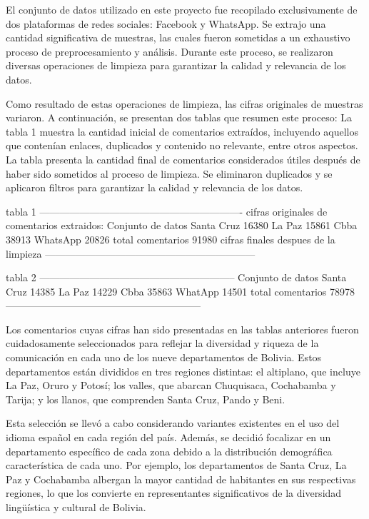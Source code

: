 El conjunto de datos utilizado en este proyecto fue recopilado exclusivamente de dos plataformas de redes sociales: Facebook y WhatsApp. Se extrajo una cantidad significativa de muestras, las cuales fueron sometidas a un exhaustivo proceso de preprocesamiento y análisis. Durante este proceso, se realizaron diversas operaciones de limpieza para garantizar la calidad y relevancia de los datos.

Como resultado de estas operaciones de limpieza, las cifras originales de muestras variaron. A continuación, se presentan dos tablas que resumen este proceso: La tabla 1 muestra la cantidad inicial de comentarios extraídos, incluyendo aquellos que contenían enlaces, duplicados y contenido no relevante, entre otros aspectos. La tabla presenta la cantidad final de comentarios considerados útiles después de haber sido sometidos al proceso de limpieza. Se eliminaron duplicados y se aplicaron filtros para garantizar la calidad y relevancia de los datos.

tabla 1
-------------------------------------------------------------
cifras originales de comentarios extraidos:
Conjunto de datos
Santa Cruz   16380
La Paz          15861
Cbba             38913
WhatsApp     20826
total comentarios 91980
cifras finales despues de la limpieza
---------------------------------------------------------------

tabla 2
-----------------------------------------------------------
Conjunto de datos
Santa Cruz  14385
La Paz 14229
Cbba 35863
WhatApp 14501
total comentarios 78978
-----------------------------------------------------------

Los comentarios cuyas cifras han sido presentadas en las tablas anteriores fueron cuidadosamente seleccionados para reflejar la diversidad y riqueza de la comunicación en cada uno de los nueve departamentos de Bolivia. Estos departamentos están divididos en tres regiones distintas: el altiplano, que incluye La Paz, Oruro y Potosí; los valles, que abarcan Chuquisaca, Cochabamba y Tarija; y los llanos, que comprenden Santa Cruz, Pando y Beni.

Esta selección se llevó a cabo considerando variantes existentes en el uso del idioma español en cada región del país. Además, se decidió focalizar en un departamento específico de cada zona debido a la distribución demográfica característica de cada uno. Por ejemplo, los departamentos de Santa Cruz, La Paz y Cochabamba albergan la mayor cantidad de habitantes en sus respectivas regiones, lo que los convierte en representantes significativos de la diversidad lingüística y cultural de Bolivia.


